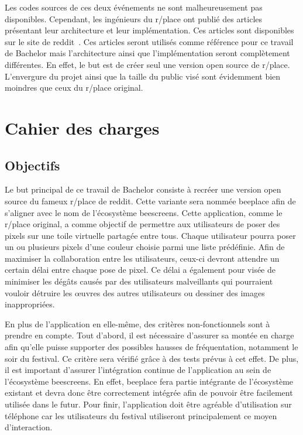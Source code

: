 Les codes sources de ces deux événements ne sont malheureusement pas disponibles. Cependant, les ingénieurs du r/place ont publié des articles présentant leur architecture et leur implémentation. Ces articles sont disponibles sur le site de \gls{reddit}~\cite{rplace2017, rplace2022}. Ces articles seront utilisés comme référence pour ce travail de Bachelor mais l'architecture ainsi que l'implémentation seront complètement différentes. En effet, le but est de créer seul une version open source de r/place. L'envergure du projet ainsi que la taille du public visé sont évidemment bien moindres que ceux du r/place original.

\section{Cahier des charges}
\label{sec:cdc}

\subsection{Objectifs}

Le but principal de ce travail de Bachelor consiste à recréer une version open source du fameux r/place de \gls{reddit}. Cette variante sera nommée \gls{beeplace} afin de s'aligner avec le nom de l'écosystème \gls{beescreens}.
Cette application, comme le r/place original, a comme objectif de permettre aux utilisateurs de poser des pixels sur une toile virtuelle partagée entre tous. Chaque utilisateur pourra poser un ou plusieurs pixels d'une couleur choisie parmi une liste prédéfinie. Afin de maximiser la collaboration entre les utilisateurs, ceux-ci devront attendre un certain délai entre chaque pose de pixel. Ce délai a également pour visée de minimiser les dégâts causés par des utilisateurs malveillants qui pourraient vouloir détruire les \oe{}uvres des autres utilisateurs ou dessiner des images inappropriées.

En plus de l'application en elle-même, des critères non-fonctionnels sont à prendre en compte. Tout d'abord, il est nécessaire d'assurer sa montée en charge afin qu'elle puisse supporter des possibles hausses de fréquentation, notamment le soir du festival. Ce critère sera vérifié grâce à des tests prévus à cet effet. De plus, il est important d'assurer l'intégration continue de l'application au sein de l'écosystème \gls{beescreens}. En effet, \gls{beeplace} fera partie intégrante de l'écosystème existant et devra donc être correctement intégrée afin de pouvoir être facilement utilisée dans le futur. Pour finir, l'application doit être agréable d'utilisation sur téléphone car les utilisateurs du festival utiliseront principalement ce moyen d'interaction.

